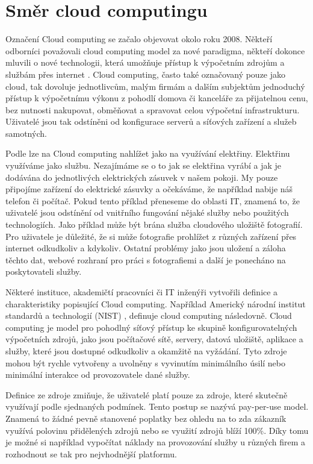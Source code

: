\chapter{Směr cloud computingu}
\setcounter{page}{1}
Označení Cloud computing se začalo objevovat okolo roku 2008\cite{ZHANG}. Někteří odborníci považovali cloud computing model za nové paradigma, někteří dokonce mluvili o nové technologii, která umožňuje přístup k výpočetním zdrojům a službám přes internet \cite{bohm2010cloud}. Cloud computing, často také označovaný pouze jako cloud, tak dovoluje jednotlivcům, malým firmám a dalším subjektům jednoduchý přístup k výpočetnímu výkonu z pohodlí domova či kanceláře za přijatelnou cenu, bez nutnosti nakupovat, obměňovat a spravovat celou výpočetní infrastrukturu. Uživatelé jsou tak odstíněni od konfigurace serverů a síťových zařízení a služeb samotných. \par
Podle \cite{cc2011principles} lze na Cloud computing nahlížet jako na využívání elektřiny. Elektřinu využíváme jako službu. Nezajímáme se o to jak se elektřina vyrábí a jak je dodávána do jednotlivých elektrických zásuvek v našem pokoji. My pouze připojíme zařízení do elektrické zásuvky a očekáváme, že například nabije náš telefon či počítač. Pokud tento příklad přeneseme do oblasti IT, znamená to, že uživatelé jsou odstínění od vnitřního fungování nějaké služby nebo použitých technologiích. Jako příklad může být brána služba cloudového uložiště fotografií. Pro uživatele je důležité, že si může fotografie prohlížet  z různých zařízení přes internet odkudkoliv a kdykoliv. Ostatní problémy jako jsou uložení a záloha těchto dat, webové rozhraní pro práci s fotografiemi a další je ponecháno na poskytovateli služby. \par 
Některé instituce, akademičtí pracovníci či IT inženýři vytvořili definice a charakteristiky  popisující Cloud computing. Například Americký národní institut standardů a technologií (NIST) \cite{mel2011nist}, definuje cloud computing následovně.
Cloud computing je model pro pohodlný síťový přístup ke skupině konfigurovatelných výpočetních zdrojů, jako jsou počítačové sítě, servery, datová uložiště, aplikace a služby, které jsou dostupné odkudkoliv a okamžitě na vyžádání. Tyto zdroje mohou být rychle vytvořeny a uvolněny  s vyvinutím minimálního úsilí nebo minimální interakce od provozovatele dané služby. \par
Definice ze zdroje \cite{Vaquero-cloud-definition} zmiňuje, že uživatelé platí pouze za zdroje, které skutečně využívají podle sjednaných podmínek. Tento postup se nazývá pay-per-use model. Znamená to žádné pevně stanovené poplatky bez ohledu na to zda zákazník využívá polovinu přidělených zdrojů nebo se využití zdrojů blíží 100\%. Díky tomu je možné si například vypočítat náklady na provozování služby u různých firem a rozhodnout se tak pro nejvhodnější platformu. \par
